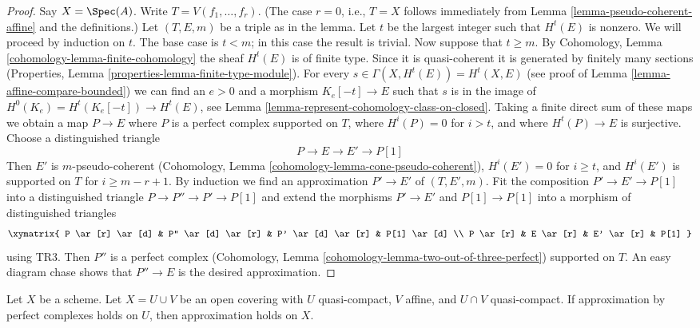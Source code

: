 \begin{proof}
Say $X = \Spec(A)$. Write $T = V(f_1, \ldots, f_r)$.
(The case $r = 0$, i.e., $T = X$ follows immediately from
Lemma \ref{lemma-pseudo-coherent-affine} and the definitions.)
Let $(T, E, m)$ be a triple as in the lemma.
Let $t$ be the largest integer such that $H^t(E)$ is nonzero.
We will proceed by induction on $t$. The base case is $t < m$; in
this case the result is trivial. Now suppose that $t \geq m$. By
Cohomology, Lemma \ref{cohomology-lemma-finite-cohomology}
the sheaf $H^t(E)$ is of finite type. Since it is quasi-coherent
it is generated by finitely many sections
(Properties, Lemma \ref{properties-lemma-finite-type-module}).
For every $s \in \Gamma(X, H^t(E)) = H^t(X, E)$
(see proof of Lemma \ref{lemma-affine-compare-bounded})
we can find an $e > 0$ and a morphism $K_e[-t] \to E$
such that $s$ is in the image of
$H^0(K_e) = H^t(K_e[-t]) \to H^t(E)$, see
Lemma \ref{lemma-represent-cohomology-class-on-closed}.
Taking a finite direct sum of these maps we obtain a map
$P \to E$ where $P$ is a perfect complex supported on $T$,
where $H^i(P) = 0$ for $i > t$, and where $H^t(P) \to E$ is
surjective. Choose a distinguished triangle
$$
P \to E \to E' \to P[1]
$$
Then $E'$ is $m$-pseudo-coherent
(Cohomology, Lemma \ref{cohomology-lemma-cone-pseudo-coherent}),
$H^i(E') = 0$ for $i \geq t$, and
$H^i(E')$ is supported on $T$ for $i \geq m - r + 1$.
By induction we find an approximation $P' \to E'$
of $(T, E', m)$. Fit the composition $P' \to E' \to P[1]$
into a distinguished triangle $P \to P'' \to P' \to P[1]$
and extend the morphisms $P' \to E'$ and $P[1] \to P[1]$ into
a morphism of distinguished triangles
$$
\xymatrix{
P \ar[r] \ar[d] & P'' \ar[d] \ar[r] & P' \ar[d] \ar[r] & P[1] \ar[d] \\
P \ar[r] &  E \ar[r] & E' \ar[r] & P[1]
}
$$
using TR3. Then $P''$ is a perfect complex
(Cohomology, Lemma \ref{cohomology-lemma-two-out-of-three-perfect})
supported on $T$.
An easy diagram chase shows that $P'' \to E$ is the desired
approximation.
\end{proof}

\begin{lemma}
\label{lemma-induction-step}
Let $X$ be a scheme. Let $X = U \cup V$ be an open covering
with $U$ quasi-compact, $V$ affine, and $U \cap V$ quasi-compact.
If approximation by perfect complexes holds on $U$,
then approximation holds on $X$.
\end{lemma}

